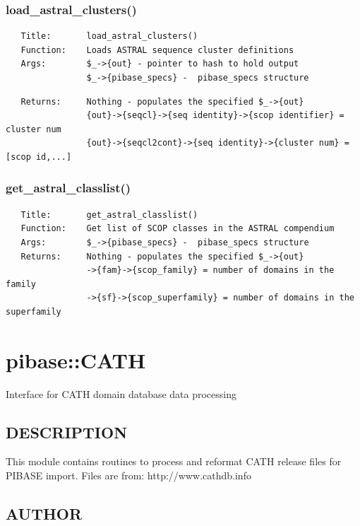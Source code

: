 \documentclass{article}
\begin{document}
\subsubsection*{load\_astral\_clusters()\label{pibase::ASTRAL_load_astral_clusters_}}
\begin{verbatim}
   Title:       load_astral_clusters()
   Function:    Loads ASTRAL sequence cluster definitions
   Args:        $_->{out} - pointer to hash to hold output
                $_->{pibase_specs} -  pibase_specs structure
\end{verbatim}
\begin{verbatim}
   Returns:     Nothing - populates the specified $_->{out}
                {out}->{seqcl}->{seq identity}->{scop identifier} = cluster num
                {out}->{seqcl2cont}->{seq identity}->{cluster num} = [scop id,...]
\end{verbatim}
\subsubsection*{get\_astral\_classlist()\label{pibase::ASTRAL_get_astral_classlist_}}
\begin{verbatim}
   Title:       get_astral_classlist()
   Function:    Get list of SCOP classes in the ASTRAL compendium
   Args:        $_->{pibase_specs} -  pibase_specs structure
   Returns:     Nothing - populates the specified $_->{out}
                ->{fam}->{scop_family} = number of domains in the family
                ->{sf}->{scop_superfamily} = number of domains in the superfamily
\end{verbatim}
\clearpage
\section{pibase::CATH\label{pibase::CATH}}


Interface for CATH domain database data processing

\subsection*{DESCRIPTION\label{pibase::CATH_DESCRIPTION}}


This module contains routines to process and reformat CATH release files
for PIBASE import.  Files are from: http://www.cathdb.info

\subsection*{AUTHOR\label{pibase::CATH_AUTHOR}}
\end{document}
